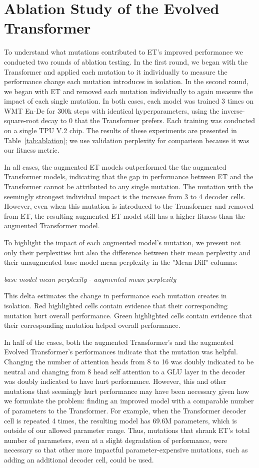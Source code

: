 \documentclass{article}
\begin{document}
\section{Ablation Study of the Evolved Transformer}
To understand what mutations contributed to ET's improved performance we conducted two rounds of ablation testing. In the first round, we began with the Transformer and applied each mutation to it individually to measure the performance change each mutation introduces in isolation. In the second round, we began with ET and removed each mutation individually to again measure the impact of each single mutation. In both cases, each model was trained 3 times on WMT En-De for 300k steps with identical hyperparameters, using the inverse-square-root decay to 0 that the Transformer prefers. Each training was conducted on a single TPU V.2 chip. The results of these experiments are presented in Table~\ref{tab:ablation}; we use validation perplexity for comparison because it was our fitness metric.

In all cases, the augmented ET models outperformed the the augmented Transformer models, indicating that the gap in performance between ET and the Transformer cannot be attributed to any single mutation. The mutation with the seemingly strongest individual impact is the increase from 3 to 4 decoder cells. However, even when this mutation is introduced to the Transformer and removed from ET, the resulting augmented ET model still has a higher fitness than the augmented Transformer model.

To highlight the impact of each augmented model's mutation, we present not only their perplexities but also the difference between their mean perplexity and their unaugmented base model mean perplexity in the "Mean Diff" columns:

\textit{base model mean perplexity} - \textit{augmented mean perplexity}


This delta estimates the change in performance each mutation creates in isolation.
Red highlighted cells contain evidence that their corresponding mutation hurt overall performance. Green highlighted cells contain evidence that their corresponding mutation helped overall performance.

In half of the cases, both the augmented Transformer's and the augmented Evolved Transformer's performances indicate that the mutation was helpful. Changing the number of attention heads from 8 to 16 was doubly indicated to be neutral and changing from 8 head self attention to a GLU layer in the decoder was doubly indicated to have hurt performance. However, this and other mutations that seemingly hurt performance may have been necessary given how we formulate the problem: finding an improved model with a comparable number of parameters to the Transformer. For example, when the Transformer decoder cell is repeated 4 times, the resulting model has 69.6M parameters, which is outside of our allowed parameter range. Thus, mutations that shrank ET's total number of parameters, even at a slight degradation of performance, were necessary so that other more impactful parameter-expensive mutations, such as adding an additional decoder cell, could be used.
\end{document}
